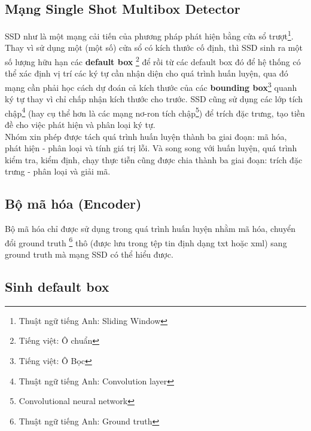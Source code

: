 \documentclass[a4paper,12pt]{article}
\begin{document}
	\subsection*{Mạng Single Shot Multibox Detector\cite{liu2016ssd}}
	SSD\cite{liu2016ssd} như là một mạng cải tiến của phương pháp phát hiện bằng cửa sổ trượt\footnote{Thuật ngữ tiếng Anh: Sliding Window}. Thay vì sử dụng một (một số) cửa sổ có kích thước cố định, thì SSD sinh ra một số lượng hữu hạn các \textbf{default box} \footnote{Tiếng việt: Ô chuẩn} để rồi từ các default box đó để hệ thống có thể xác định vị trí các ký tự cần nhận diện cho quá trình huấn luyện, qua đó mạng cần phải học cách dự đoán cả kích thước của các \textbf{bounding box}\footnote{Tiếng việt: Ô Bọc} quanh ký tự thay vì chỉ chấp nhận kích thước cho trước. SSD\cite{liu2016ssd} cũng sử dụng các lớp tích chập\footnote{Thuật ngữ tiếng Anh: Convolution layer} (hay cụ thể hơn là các mạng nơ-ron tích chập\footnote{Convolutional neural network}) để trích đặc trưng, tạo tiền đề cho việc phát hiện và phân loại ký tự. \\
	Nhóm xin phép được tách quá trình huấn luyện thành ba giai đoạn: mã hóa, phát hiện - phân loại và tính giá trị lỗi. Và song song với huấn luyện, quá trình kiểm tra, kiểm định, chạy thực tiễn cũng được chia thành ba giai đoạn: trích đặc trưng - phân loại và giải mã.
	
	\subsection{Bộ mã hóa (Encoder)}
	Bộ mã hóa chỉ được sử dụng trong quá trình huấn luyện nhằm mã hóa, chuyển đổi ground truth \footnote{Thuật ngữ tiếng Anh: Ground truth} thô (được lưu trong tệp tin định dạng txt hoặc xml) sang ground truth mà mạng SSD\cite{liu2016ssd} có thể hiểu được.
	
	\subsection*{Sinh default box}
	
\end{document}
